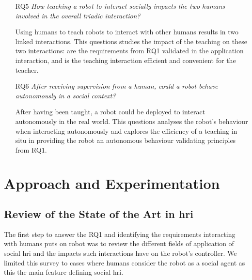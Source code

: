 \begin{itemize}
	\item [RQ5] \emph{How teaching a robot to interact socially impacts the two humans involved in the overall triadic interaction?}
	
		Using humans to teach robots to interact with other humans results in two linked interactions. This questions studies the impact of the teaching on these two interactions: are the requirements from RQ1 validated in the application interaction, and is the teaching interaction efficient and convenient for the teacher.
		
    \item [RQ6] \emph{After receiving supervision from a human, could a robot behave autonomously in a social context?}

	 	After having been taught, a robot could be deployed to interact autonomously in the real world. This questions analyses the robot's behaviour when interacting autonomously and explores the efficiency of a teaching in situ in providing the robot an autonomous behaviour validating principles from RQ1.
	 
\end{itemize}

\section{Approach and Experimentation}

\subsection{Review of the State of the Art in \gls{hri}}
The first step to answer the RQ1 and identifying the requirements interacting with humans puts on robot was to review the different fields of application of social \gls{hri} and the impacts such interactions have on the robot's controller. We limited this survey to cases where humans consider the robot as a social agent as this the main feature defining social \gls{hri}. 

